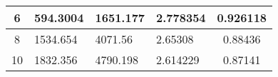 \begin{table}[]
\begin{tabular}{|c|l|l|l|c|}
6                                                                                                                     & 594.3004                                                                                                                                                                  & 1651.177                                                                                                                                   & 2.778354                               & 0.926118            \\ \hline
8                                                                                                                     & 1534.654                                                                                                                                                                  & 4071.56                                                                                                                                    & 2.65308                                & 0.88436             \\ \hline
10                                                                                                                    & 1832.356                                                                                                                                                                  & 4790.198                                                                                                                                   & 2.614229                               & 0.87141             \\ \hline
\end{tabular}
\end{table}

